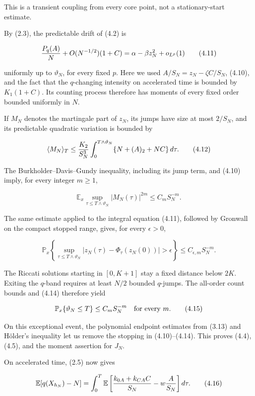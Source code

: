 This is a transient coupling from every core point, not a
stationary-start estimate.

By (2.3), the predictable drift of (4.2) is

\[
 {P_q(A)\over N}+O(N^{-1/2})(1+C)
 =\alpha-\beta z_N^2+o_{L^p}(1)                            \tag{4.11}
\]

uniformly up to \(\vartheta_N\), for every fixed \(p\). Here we used
\(A/S_N=z_N-\zeta C/S_N\), (4.10), and the fact that the \(q\)-changing
intensity on accelerated time is bounded by \(K_1(1+C)\). Its counting
process therefore has moments of every fixed order bounded uniformly in
\(N\).

If \(M_N\) denotes the martingale part of \(z_N\), its jumps have size
at most \(2/S_N\), and its predictable quadratic variation is bounded by

\[
 \langle M_N\rangle_T
 \le {K_2\over S_N^3}\int_0^{T\wedge\vartheta_N}
       \{N+(A)_2+NC\}\,d\tau.                             \tag{4.12}
\]

The Burkholder--Davis--Gundy inequality, including its jump term, and
(4.10) imply, for every integer \(m\ge1\),

\[
 \mathbb E_x\sup_{\tau\le T\wedge\vartheta_N}|M_N(\tau)|^{2m}
 \le C_mS_N^{-m}.                                        \tag{4.13}
\]

The same estimate applied to the integral equation (4.11), followed by
Gronwall on the compact stopped range, gives, for every \(\epsilon>0\),

\[
 \mathbb P_x\!\left\{
 \sup_{\tau\le T\wedge\vartheta_N}
 |z_N(\tau)-\Phi_\tau(z_N(0))|>\epsilon\right\}
 \le C_{\epsilon,m}S_N^{-m}.                              \tag{4.14}
\]

The Riccati solutions starting in \([0,K+1]\) stay a fixed distance
below \(2K\). Exiting the \(q\)-band requires at least \(N/2\) bounded
\(q\)-jumps. The all-order count bounds and (4.14) therefore yield

\[
 \mathbb P_x\{\vartheta_N\le T\}\le C_mS_N^{-m}
 \quad\hbox{for every }m.                                 \tag{4.15}
\]

On this exceptional event, the polynomial endpoint estimates from (3.13)
and Hölder's inequality let us remove the stopping in (4.10)--(4.14).
This proves (4.4), (4.5), and the moment assertion for \(J_N\).

On accelerated time, (2.5) now gives

\[
 \mathbb E[q(X_{h_N})-N]
 =\int_0^T\mathbb E\left[
 {k_{0A}+k_{CA}C\over S_N}-w{A\over S_N}\right]d\tau.      \tag{4.16}
\]


